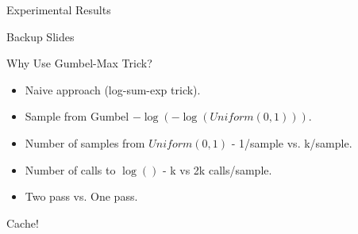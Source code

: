\begin{frame}{Experimental Results}
\end{frame}

\begin{frame}
  Backup Slides
\end{frame}

\begin{frame}{Why Use Gumbel-Max Trick?}
  \begin{itemize}[<+->]
  \item Naive approach (log-sum-exp trick).
  \item Sample from Gumbel $-\log(-\log(Uniform(0,1)))$.
  \item Number of samples from $Uniform(0,1)$ - 1/sample vs. k/sample.
  \item Number of calls to $\log()$ - k vs 2k calls/sample.
  \item Two pass vs. One pass.
  \end{itemize}
  \begin{center}
    Cache!
  \end{center}
\end{frame}

